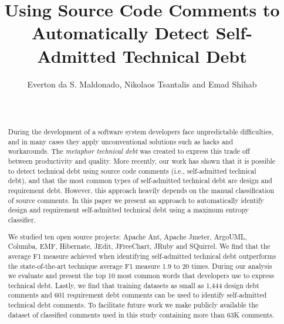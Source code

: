 \documentclass{sig-alternate}
\newcommand{\SATD}{self-admitted technical debt\xspace}
\begin{document}

\title{Using Source Code Comments to Automatically Detect Self-Admitted Technical Debt}

\author{
\alignauthor 
       Everton da S. Maldonado, Nikolaos Tsantalis and Emad Shihab\\
       \\
       \\
}

\maketitle
\begin{abstract}
During the development of a software system developers face unpredictable difficulties, and in many cases they apply unconventional solutions such as hacks and workarounds. The \textit{metaphor technical debt} was created to express this trade off between productivity and quality. More recently, our work has shown that it is possible to detect technical debt using source code comments (i.e., self-admitted technical debt), and that the most common types of self-admitted technical debt are design and requirement debt. However, this approach heavily depends on the manual classification of source comments. In this paper we present an approach to automatically identify design and requirement \SATD using a maximum entropy classifier. 

We studied ten open source projects: Apache Ant, Apache Jmeter, ArgoUML, Columba, EMF, Hibernate, JEdit, JFreeChart, JRuby and SQuirrel. We find that the average F1 measure achieved when identifying \SATD outperforms the state-of-the-art technique average F1 measure 1.9 to 20 times. During our analysis we evaluate and present the top 10 most common words that developers use to express technical debt. Lastly, we find that training datasets as small as 1,444 design debt comments and 601 requirement debt comments can be used to identify \SATD comments. To facilitate future work we make publicly available the dataset of classified comments used in this study containing more than 63K comments. 
\end{abstract}
\end{document}
